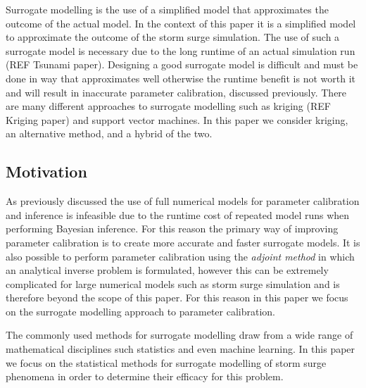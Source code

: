 \documentclass[12pt,a4paper]{article}
\begin{document}
Surrogate modelling is the use of a simplified model that approximates the outcome of the actual model. In the context of this paper it is a simplified model to approximate the outcome of the storm surge simulation. The use of such a surrogate model is necessary due to the long runtime of an actual simulation run (REF Tsunami paper). Designing a good surrogate model is difficult and must be done in way that approximates well otherwise the runtime benefit is not worth it and will result in inaccurate parameter calibration, discussed previously. There are many different approaches to surrogate modelling such as kriging (REF Kriging paper) and support vector machines. In this paper we consider kriging, an alternative method, and a hybrid of the two.

\subsection{Motivation}
\noindent
As previously discussed the use of full numerical models for parameter calibration and inference is infeasible due to the runtime cost of repeated model runs when performing Bayesian inference. For this reason the primary way of improving parameter calibration is to create more accurate and faster surrogate models. It is also possible to perform parameter calibration using the \textit{adjoint method} in which an analytical inverse problem is formulated, however this can be extremely complicated for large numerical models such as storm surge simulation and is therefore beyond the scope of this paper. For this reason in this paper we focus on the surrogate modelling approach to parameter calibration.

The commonly used methods for surrogate modelling draw from a wide range of mathematical disciplines such statistics and even machine learning. In this paper we focus on the statistical methods for surrogate modelling of storm surge phenomena in order to determine their efficacy for this problem.
\end{document}
